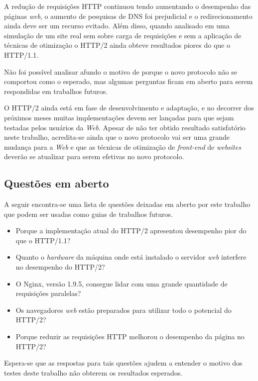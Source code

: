 A redução de requisições HTTP continuou tendo aumentando o desempenho das páginas \textit{web}, o aumento de pesquisas de DNS foi prejudicial e o redirecionamento ainda deve ser um recurso evitado. Além disso, quando analisado em uma simulação de um site real sem sobre carga de requisições e sem a aplicação de técnicas de otimização o HTTP/2 ainda obteve resultados piores do que o HTTP/1.1.

Não foi possível analisar afundo o motivo de porque o novo protocolo não se comportou como o esperado, mas algumas perguntas ficam em aberto para serem respondidas em trabalhos futuros.

O HTTP/2 ainda está em fase de desenvolvimento e adaptação, e no decorrer dos próximos meses muitas implementações devem ser lançadas para que sejam testadas pelos usuários da \textit{Web}. Apesar de não ter obtido resultado satisfatório neste trabalho, acredita-se ainda que o novo protocolo vai ser uma grande mudança para a \textit{Web} e que as técnicas de otimização de \textit{front-end} de \textit{websites} deverão se atualizar para serem efetivas no novo protocolo.

\subsection{Questões em aberto}
\label{questoesemaberto}

A seguir encontra-se uma lista de questões deixadas em aberto por este trabalho que podem ser usadas como guias de trabalhos futuros.

\begin{itemize}
	\item Porque a implementação atual do HTTP/2 apresentou desempenho pior do que o HTTP/1.1?
	\item Quanto o \textit{hardware} da máquina onde está instalado o servidor \textit{web} interfere no desempenho do HTTP/2?
	\item O Nginx, versão 1.9.5, consegue lidar com uma grande quantidade de requisições paralelas?
	\item Os navegadores \textit{web} estão preparados para utilizar todo o potencial do HTTP/2?
	\item Porque reduzir as requisições HTTP melhorou o desempenho da página no HTTP/2?
\end{itemize}

Espera-se que as respostas para tais questões ajudem a entender o motivo dos testes deste trabalho não obterem os resultados esperados.